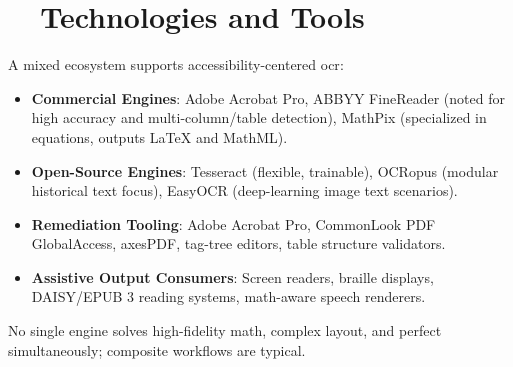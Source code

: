 \section{~~Technologies and Tools}
\label{sec:ocr-tools}
A mixed ecosystem supports accessibility-centered \gls{ocr}:
\begin{itemize}
	\item \textbf{Commercial Engines}: Adobe Acrobat Pro, ABBYY FineReader (noted for high accuracy and multi-column/table detection), MathPix (specialized in equations, outputs LaTeX and MathML).
	\item \textbf{Open-Source Engines}: Tesseract (flexible, trainable), OCRopus (modular historical text focus), EasyOCR (deep-learning image text scenarios).
	\item \textbf{Remediation Tooling}: Adobe Acrobat Pro, CommonLook PDF GlobalAccess\supercite{AllyantCommonLook}, axesPDF, tag-tree editors, table structure validators.
	\item \textbf{Assistive Output Consumers}: Screen readers, braille displays, DAISY/EPUB 3 reading systems, math-aware speech renderers.
\end{itemize}
No single engine solves high-fidelity math, complex layout, and perfect  simultaneously; composite workflows are typical.

